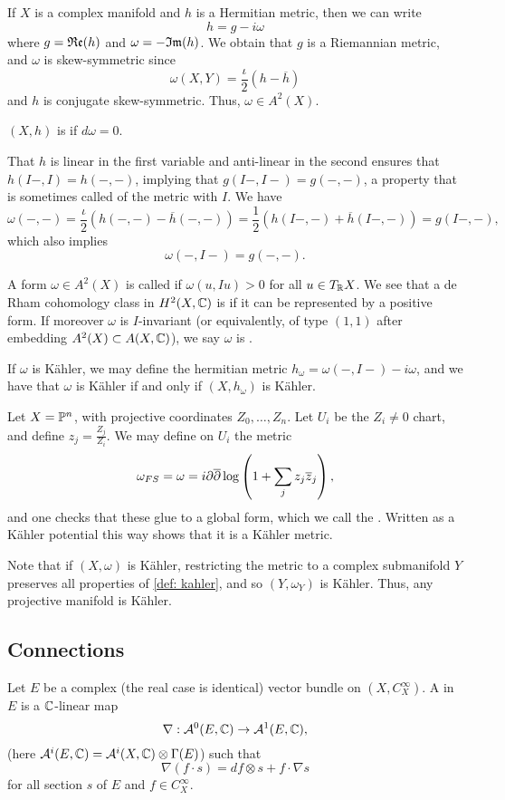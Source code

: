 If $X$ is a complex manifold and $h$ is a  Hermitian metric, then we can write
\[
h=g-i\omega
\]
where $g=\mathfrak{R}\mathfrak{e}(h)$ and $\omega=-\mathfrak{I}\mathfrak{m}(h)$. We obtain that $g$ is a Riemannian metric, and $\omega$ is skew-symmetric since
\[
\omega(X,Y)=\frac{\iota}{2}(h-\overline h)
\]
and $h$ is conjugate skew-symmetric. Thus, $\omega\in A^2(X)$.
\begin{definition}
	$(X,h)$ is  if $d\omega=0$.
\end{definition}
That $h$ is linear in the first variable and anti-linear in the second ensures that $h(I-,I)=h(-,-)$, implying that $g(I-,I-)=g(-,-)$, a property that is sometimes called  of the metric with $I$. We have 
\[
\omega(-,-)=\frac{\iota}{2}(h(-,-)-\overline h(-,-))=\frac{1}{2}(h(I-,-)+\overline h (I-,-))=g(I-,-),
\]
which also implies
\[
\omega(-,I-)=g(-,-).
\]
\begin{definition}\label{def: kahler}
	A form $\omega\in A^2(X)$ is called  if $\omega(u,Iu)>0$ for all $u\in T_\mathbb R X$. We see that a de Rham cohomology class in $H^2(X,\mathbb C)$ is  if it can be represented by a positive form. If moreover $\omega$ is $I$-invariant (or equivalently, of type $(1,1)$ after embedding $A^2(X)\subset A(X,\mathbb C)$), we say $\omega$ is .
\end{definition}
If $\omega$ is Kähler, we may define the hermitian metric $h_\omega=\omega(-,I-)-i\omega$, and we have that $\omega$ is Kähler if and only if $(X,h_\omega)$ is Kähler.
\begin{example}
	Let $X=\mathbb{P}^n$, with projective coordinates $Z_0,\dots,Z_n$. Let $U_i$ be the $Z_i\neq 0$ chart, and define $z_j=\frac{Z_j}{Z_i}$. We may define on $U_i$ the metric
	\[
	\omega_{FS}=\omega=i\partial\overline\partial\log\left(1+\sum_jz_j\overline z_j\right),
	\]
	and one checks that these glue to a global form, which we call the . Written as a Kähler potential this way shows that it is a Kähler metric.
\end{example}
Note that if $(X,\omega)$ is Kähler, restricting the metric to a complex submanifold $Y$ preserves all properties of \autoref{def: kahler}, and so $(Y,\omega_Y)$ is Kähler. Thus, any projective manifold is Kähler.

\subsection{Connections}

Let $E$ be a complex (the real case is identical) vector bundle on $(X,C_X^\infty)$. A  in $E$ is a $\mathbb C$-linear map 
\[
\nabla:\mathcal{A}^0(E,\mathbb C)\to \mathcal{A}^1(E,\mathbb C),
\]
(here $\mathcal{A}^i(E,\mathbb C)= \mathcal{A}^i(X,\mathbb C)\otimes \Gamma(E)$) such that
%
\[
\nabla(f\cdot s)=df\otimes s+f\cdot\nabla s
\]
for all section $s$ of $E$ and $f\in C^\infty_X$.

